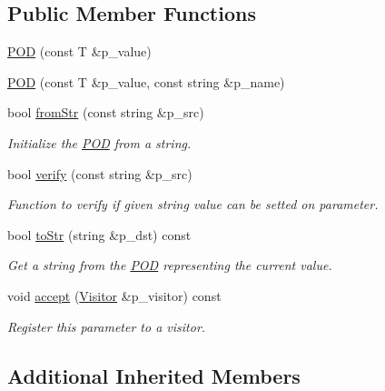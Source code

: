 \subsection*{Public Member Functions}
\begin{DoxyCompactItemize}
\item 
\hyperlink{classxtd_1_1servers_1_1param_1_1POD_a8f374c2b8622bdcec87a746b07bad388}{P\-O\-D} (const T \&p\-\_\-value)
\item 
\hyperlink{classxtd_1_1servers_1_1param_1_1POD_aec8808c77e41c5156828840c5764a0af}{P\-O\-D} (const T \&p\-\_\-value, const string \&p\-\_\-name)
\item 
bool \hyperlink{classxtd_1_1servers_1_1param_1_1POD_ac6754089526df6eb0eef539be830c668}{from\-Str} (const string \&p\-\_\-src)
\begin{DoxyCompactList}\small\item\em Initialize the \hyperlink{classxtd_1_1servers_1_1param_1_1POD}{P\-O\-D} from a string. \end{DoxyCompactList}\item 
bool \hyperlink{classxtd_1_1servers_1_1param_1_1POD_aded664a97a02450a9270dd04af042d0c}{verify} (const string \&p\-\_\-src)
\begin{DoxyCompactList}\small\item\em Function to verify if given string value can be setted on parameter. \end{DoxyCompactList}\item 
bool \hyperlink{classxtd_1_1servers_1_1param_1_1POD_a6b40b7e5cd208c4ab848edb753c612f7}{to\-Str} (string \&p\-\_\-dst) const 
\begin{DoxyCompactList}\small\item\em Get a string from the \hyperlink{classxtd_1_1servers_1_1param_1_1POD}{P\-O\-D} representing the current value. \end{DoxyCompactList}\item 
void \hyperlink{classxtd_1_1servers_1_1param_1_1POD_a828a1fa2391bc087f396b87a1d7c793a}{accept} (\hyperlink{classxtd_1_1servers_1_1param_1_1Visitor}{Visitor} \&p\-\_\-visitor) const 
\begin{DoxyCompactList}\small\item\em Register this parameter to a visitor. \end{DoxyCompactList}\end{DoxyCompactItemize}
\subsection*{Additional Inherited Members}


